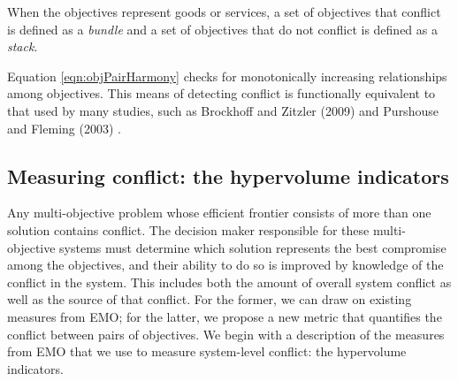 When the objectives represent goods or services, a set of objectives that conflict is defined as a \textit{bundle} and a set of objectives that do not conflict is defined as a \textit{stack}.

Equation \eqref{eqn:objPairHarmony} checks for monotonically increasing relationships among objectives. This means of detecting conflict is functionally equivalent to that used by many studies, such as Brockhoff and Zitzler (2009) \cite{brockhoff2009objective} and Purshouse and Fleming (2003) \cite{purshouse2003conflict}.

\subsection{Measuring conflict: the hypervolume indicators}
\label{sec:waysToMeasureFrontiers}
Any multi-objective problem whose efficient frontier consists of more than one solution contains conflict. The decision maker responsible for these multi-objective systems must determine which solution represents the best compromise among the objectives, and their ability to do so is improved by knowledge of the conflict in the system. This includes both the amount of overall system conflict as well as the source of that conflict. For the former, we can draw on existing measures from EMO; for the latter, we propose a new metric that quantifies the conflict between pairs of objectives. We begin with a description of the measures from EMO that we use to measure system-level conflict: the hypervolume indicators.



